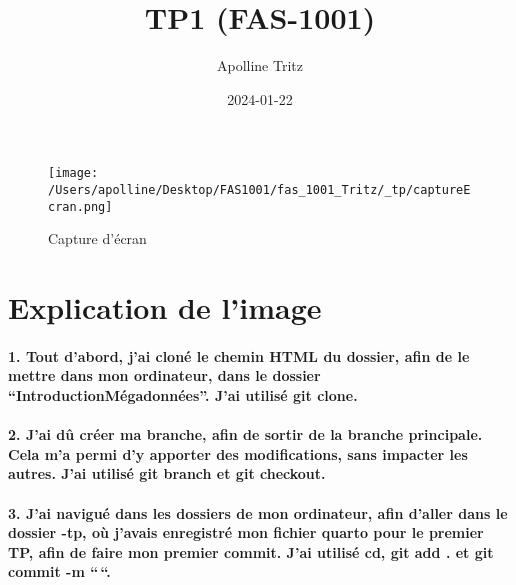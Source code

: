 \documentclass[
  letterpaper,
  DIV=11,
  numbers=noendperiod]{scrartcl}
\title{TP1 (FAS-1001)}
\author{Apolline Tritz}
\date{2024-01-22}
\let\oldparagraph\paragraph
\renewcommand{\paragraph}[1]{\oldparagraph{#1}\mbox{}}
\begin{document}
\maketitle

\begin{figure}[H]

{\centering \texttt{[image: /Users/apolline/Desktop/FAS1001/fas\_1001\_Tritz/\_tp/captureEcran.png]}

}

\caption{Capture d'écran}

\end{figure}%

\section{Explication de l'image}\label{explication-de-limage}

\paragraph{1. Tout d'abord, j'ai cloné le chemin HTML du dossier, afin
de le mettre dans mon ordinateur, dans le dossier
``IntroductionMégadonnées''. J'ai utilisé git
clone.}\label{tout-dabord-jai-clonuxe9-le-chemin-html-du-dossier-afin-de-le-mettre-dans-mon-ordinateur-dans-le-dossier-introductionmuxe9gadonnuxe9es.-jai-utilisuxe9-git-clone.}

\paragraph{2. J'ai dû créer ma branche, afin de sortir de la branche
principale. Cela m'a permi d'y apporter des modifications, sans impacter
les autres. J'ai utilisé git branch et git
checkout.}\label{jai-duxfb-cruxe9er-ma-branche-afin-de-sortir-de-la-branche-principale.-cela-ma-permi-dy-apporter-des-modifications-sans-impacter-les-autres.-jai-utilisuxe9-git-branch-et-git-checkout.}

\paragraph{3. J'ai navigué dans les dossiers de mon ordinateur, afin
d'aller dans le dossier -tp, où j'avais enregistré mon fichier quarto
pour le premier TP, afin de faire mon premier commit. J'ai utilisé cd,
git add . et git commit -m
``\,``.}\label{jai-naviguuxe9-dans-les-dossiers-de-mon-ordinateur-afin-daller-dans-le-dossier--tp-ouxf9-javais-enregistruxe9-mon-fichier-quarto-pour-le-premier-tp-afin-de-faire-mon-premier-commit.-jai-utilisuxe9-cd-git-add-.-et-git-commit--m-.}
\end{document}
